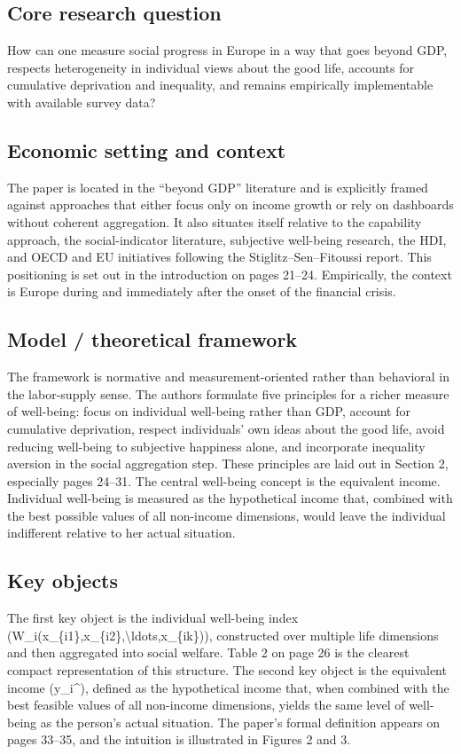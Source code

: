 \documentclass[11pt,a4paper]{article}
\begin{document}
\subsection*{Core research question}
How can one measure social progress in Europe in a way that goes beyond GDP, respects heterogeneity in individual views about the good life, accounts for cumulative deprivation and inequality, and remains empirically implementable with available survey data?

\subsection*{Economic setting and context}
The paper is located in the “beyond GDP” literature and is explicitly framed against approaches that either focus only on income growth or rely on dashboards without coherent aggregation. It also situates itself relative to the capability approach, the social-indicator literature, subjective well-being research, the HDI, and OECD and EU initiatives following the Stiglitz–Sen–Fitoussi report. This positioning is set out in the introduction on pages 21–24. Empirically, the context is Europe during and immediately after the onset of the financial crisis.

\subsection*{Model / theoretical framework}
The framework is normative and measurement-oriented rather than behavioral in the labor-supply sense. The authors formulate five principles for a richer measure of well-being: focus on individual well-being rather than GDP, account for cumulative deprivation, respect individuals’ own ideas about the good life, avoid reducing well-being to subjective happiness alone, and incorporate inequality aversion in the social aggregation step. These principles are laid out in Section 2, especially pages 24–31. The central well-being concept is the equivalent income. Individual well-being is measured as the hypothetical income that, combined with the best possible values of all non-income dimensions, would leave the individual indifferent relative to her actual situation.

\subsection*{Key objects}
The first key object is the individual well-being index (W\_i(x\_\{i1\},x\_\{i2\},\textbackslash{}ldots,x\_\{ik\})), constructed over multiple life dimensions and then aggregated into social welfare. Table 2 on page 26 is the clearest compact representation of this structure. The second key object is the equivalent income (y\_i\textasciicircum{}), defined as the hypothetical income that, when combined with the best feasible values of all non-income dimensions, yields the same level of well-being as the person’s actual situation. The paper’s formal definition appears on pages 33–35, and the intuition is illustrated in Figures 2 and 3.
\end{document}
